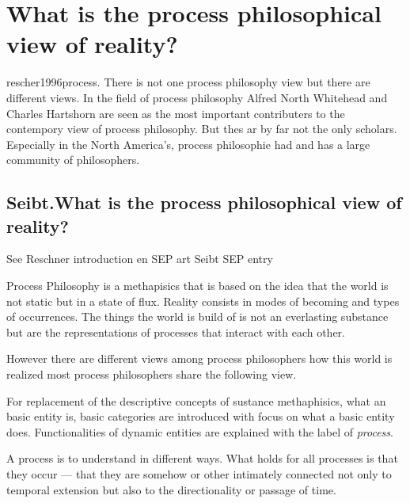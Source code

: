 
\section{What is the process philosophical view of reality?}
{rescher1996process}.
There is not one process philosophy view but there are 
different views.
In the field of process philosophy Alfred North Whitehead and 
Charles Hartshorn are seen as the most important contributers 
to the contempory view of process philosophy. 
But thes ar by far not the only scholars. Especially in the 
North America's, process philosophie had and has a large 
community of philosophers. 
\cite{rescher1996process}

\subsection{Seibt.What is the process philosophical view of reality?}


See Reschner introduction en SEP art \cite{rescher-2012-sep}
Seibt SEP entry \cite{seibt-2013-sep}

Process Philosophy is a methapisics that is based on the idea that the world is not static but in a state of flux. Reality consists in modes of becoming and types of occurrences. 
The things the world is build of is not an everlasting substance but are the representations of processes that interact with each other.  

However there are different views among process philosophers how this world is realized  most process philosophers share the following view.

For replacement of the descriptive concepts of sustance methaphisics, what an basic entity is, basic categories are introduced with focus on what a basic entity does.
Functionalities of dynamic entities are explained with the label of \textit{process}. 

A process is to understand in different ways. 
What holds for all processes is that they occur — that they are somehow or other intimately connected not only to temporal extension but also to the directionality or passage of time.

